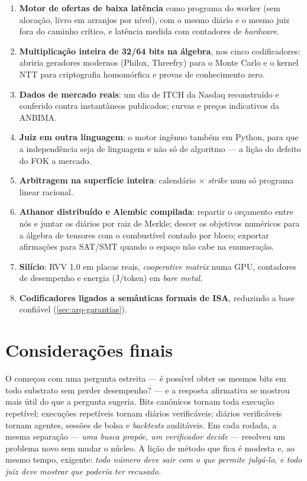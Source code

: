 \begin{enumerate}
  \item \textbf{Motor de ofertas de baixa latência} como programa do worker (sem alocação, livro em arranjos por nível), com o mesmo diário e o mesmo juiz fora do caminho crítico, e latência medida com contadores de \textit{hardware}.
  \item \textbf{Multiplicação inteira de 32/64 bits na álgebra}, nos cinco codificadores: abriria geradores modernos (Philox, Threefry) para o Monte Carlo e o kernel NTT para criptografia homomórfica e provas de conhecimento zero.
  \item \textbf{Dados de mercado reais}: um dia de ITCH da Nasdaq reconstruído e conferido contra instantâneos publicados; curvas e preços indicativos da ANBIMA.
  \item \textbf{Juiz em outra linguagem}: o motor ingênuo também em Python, para que a independência seja de linguagem e não só de algoritmo --- a lição do defeito do FOK a mercado.
  \item \textbf{Arbitragem na superfície inteira}: calendário $\times$ \textit{strike} num só programa linear racional.
  \item \textbf{Athanor distribuído e Alembic compilada}: repartir o orçamento entre nós e juntar os diários por raiz de Merkle; descer os objetivos numéricos para a álgebra de tensores com o combustível contado por bloco; exportar afirmações para SAT/SMT quando o espaço não cabe na enumeração.
  \item \textbf{Silício}: RVV 1.0 em placas reais, \textit{cooperative matrix} numa GPU, contadores de desempenho e energia (J/token) em \textit{bare metal}.
  \item \textbf{Codificadores ligados a semânticas formais de ISA}, reduzindo a base confiável (\autoref{sec:arq-garantias}).
\end{enumerate}

\section{Considerações finais}

O \vapor{} começou com uma pergunta estreita --- é possível obter os mesmos bits em todo substrato sem perder desempenho? --- e a resposta afirmativa se mostrou mais útil do que a pergunta sugeria. Bits canônicos tornam toda execução repetível; execuções repetíveis tornam diários verificáveis; diários verificáveis tornam agentes, sessões de bolsa e \textit{backtests} auditáveis. Em cada rodada, a mesma separação --- \emph{uma busca propõe, um verificador decide} --- resolveu um problema novo sem mudar o núcleo. A lição de método que fica é modesta e, ao mesmo tempo, exigente: \emph{todo número deve sair com o que permite julgá-lo, e todo juiz deve mostrar que poderia ter recusado.}
